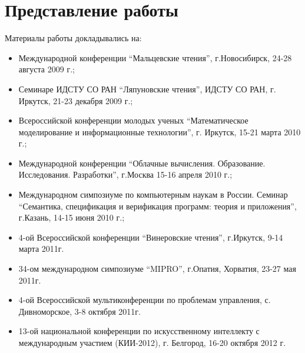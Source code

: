 \section*{Представление работы}
Материалы работы докладывались на:
\begin{itemize}
\item Международной конференции ``Мальцевские чтения'', г.Новосибирск, 24-28 августа 2009 г.;
\item Семинаре ИДСТУ СО РАН ``Ляпуновские чтения'', ИДСТУ СО РАН, г. Иркутск, 21-23 декабря 2009 г.;
\item Всероссийской конференции молодых ученых ``Математическое моделирование и информационные технологии'', г. Иркутск, 15-21 марта 2010 г.;
\item Международной конференции ``Облачные вычисления. Образование. Исследования. Разработки'', г.Москва 15-16 апреля 2010 г.;
\item Международном симпозиуме по компьютерным наукам в России. Семинар ``Семантика, спецификация и верификация программ: теория и приложения'', г.Казань, 14-15 июня 2010 г.;
\item 4-ой Всероссийской конференции ``Винеровские чтения'', г.Иркутск, 9-14 марта 2011г.
\item 34-ом международном симпозиуме ``MIPRO'', г.Опатия, Хорватия, 23-27 мая 2011г.
\item 4-ой Всероссийской мультиконференции по проблемам управления, с. Дивноморское, 3-8 октября 2011г.
\item 13-ой национальной конференции по искусственному интеллекту с международным участием (КИИ-2012), г. Белгород, 16-20 октября 2012 г.
\end{itemize}



